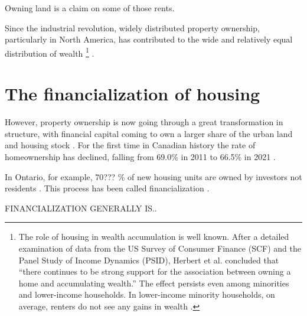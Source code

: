 Owning land is a claim on some of those rents. 

Since the industrial revolution, widely distributed property ownership, particularly in North America, has contributed to the wide and relatively equal distribution of {wealth} \footnote{The role of housing in wealth accumulation is well known. After a detailed  examination of data from the US Survey of Consumer Finance (SCF) and the Panel Study of Income Dynamics (PSID), Herbert et al. concluded that ``there continues to be strong support for the association between owning a home and accumulating wealth.'' The effect persists even among minorities and lower-income households. In lower-income minority households, on average, renters do not see any gains in wealth \cite{herbertHomeownershipStillEffective2013}.} \cite{pikettyCapitalTwentyfirstCentury2014, harrisGrowthHomeOwnership1977, chevanGrowthHomeOwnership1989, andrewsEvolutionHomeownershipRates2011}. 

\section{The financialization of housing}
However, property ownership is now going through a great transformation in structure, with financial capital coming to own a larger share of the urban land and housing stock \cite{farhaReportFinancializationHousing2017, palleyFinancializationWhatIt2007}. For the first time in Canadian history the rate of homeownership has declined, falling from 69.0\%  in 2011 to 66.5\% in 2021 \cite{statisticscanadaBuyRentHousing2022}.

In Ontario, for example, 70??? \% of new housing units are owned by investors not residents \cite{GET77percent}. %
This process has been called financialization \cite{farhaReportFinancializationHousing2017, hansenFinanceCapitalismFinancialization2014}
\cite{tomaskovic-deveyFinancializationCausesInequality2013, palleyFinancializationWhatIt2007, seccarecciaUnderstandingFinancializationHistory2013, nemtinFinancializationHousingSocial2021}.  

FINANCIALIZATION GENERALLY IS..


